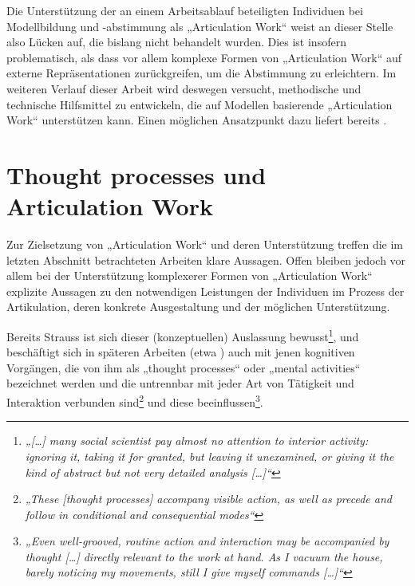 Die Unterstützung der an einem Arbeitsablauf beteiligten Individuen bei Modellbildung und -abstimmung als „Articulation Work“ weist an dieser Stelle also Lücken auf, die bislang nicht behandelt wurden. Dies ist insofern problematisch, als dass vor allem komplexe Formen von „Articulation Work“ auf externe Repräsentationen zurückgreifen, um die Abstimmung zu erleichtern. Im weiteren Verlauf dieser Arbeit wird deswegen versucht, methodische und technische Hilfsmittel zu entwickeln, die auf Modellen basierende „Articulation Work“ unterstützen kann. Einen möglichen Ansatzpunkt dazu liefert bereits \citet{Strauss93}.



\section{Thought processes und Articulation Work} %
\label{sec:aw_fazit}

Zur Zielsetzung von „Articulation Work“ und deren Unterstützung treffen die im letzten Abschnitt betrachteten Arbeiten klare Aussagen. Offen bleiben jedoch vor allem bei der Unterstützung komplexerer Formen von „Articulation Work“ explizite Aussagen zu den notwendigen Leistungen der Individuen im Prozess der Artikulation, deren konkrete Ausgestaltung und der möglichen Unterstützung. 

Bereits Strauss ist sich dieser (konzeptuellen) Auslassung bewusst\footnote{\emph{„[\ldots] many social scientist pay almost no attention to interior activity: ignoring it, taking it for granted, but leaving it unexamined, or giving it the kind of abstract but not very detailed analysis [\ldots]“}\citep[][S. 131]{Strauss93}}, und beschäftigt sich in späteren Arbeiten (etwa \citep{Strauss93}) auch mit jenen kognitiven Vorgängen, die von ihm als „thought processes“ oder „mental activities“ bezeichnet werden und die untrennbar mit jeder Art von Tätigkeit und Interaktion verbunden sind\footnote{\emph{„These [thought processes] accompany visible action, as well as precede and follow in conditional and consequential modes“}\citep[][S. 146]{Strauss93}} und diese beeinflussen\footnote{\emph{„Even well-grooved, routine action and interaction may be accompanied by thought [\ldots] directly relevant to the work at hand. As I vacuum the house, barely noticing my movements, still I give myself commands [\ldots]“}\citep[][S. 132]{Strauss93}}. 


